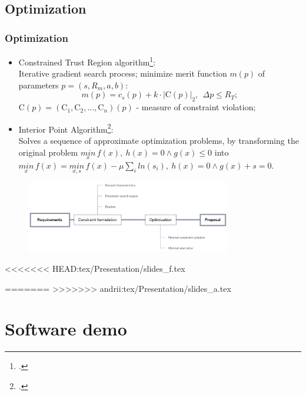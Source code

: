 \documentclass[10pt]{beamer}
\begin{document}
\subsection{Optimization}
\begin{frame}
  \frametitle{Optimization}
  \begin{itemize}
    \item Constrained Trust Region algorithm\footcite{scipyctr}:\\
      Iterative gradient search process; minimize merit function $m(p)$ of parameters $p = (s, R_m, a, b)$:
      \[
      m(p) = c_s(p) + k \cdot |\text{C}(p)|_2,\ \ \Delta p \leq R_T;
      \]
      C$(p) = (\text{C}_1,\text{C}_2,...,\text{C}_n)(p)$ - measure of constraint violation;
    \item Interior Point Algorithm\footcite{sqp}:\\
    Solves a sequence of approximate optimization problems, by transforming the original problem $\underset{x}{min}\,f\left(x\right),\:h\left(x\right)=0\wedge g\left(x\right)\leq0$ into $\underset{x}{min}\,f\left(x\right)=\underset{x,s}{min}\,f\left(x\right)-\mu\underset{i}{\sum}ln\left(s_{i}\right),\:h\left(x\right)=0\wedge g\left(x\right)+s=0$.
  \end{itemize}
  \vspace{-0.34cm}
  \begin{figure}
    \includegraphics[width=0.8\textwidth]{blok_cxema}
  \end{figure}

\end{frame}

<<<<<<< HEAD:tex/Presentation/slides_f.tex

=======
>>>>>>> andrii:tex/Presentation/slides_a.tex
\section{Software demo}
\end{document}
